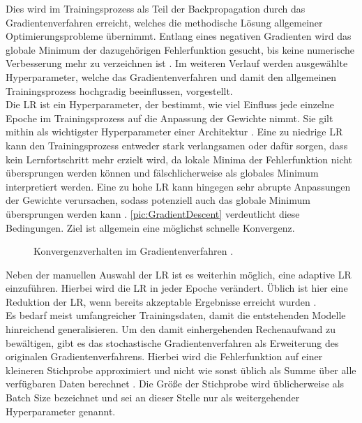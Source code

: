\noindent
Dies wird im Trainingsprozess als Teil der Backpropagation durch das Gradientenverfahren erreicht, welches die methodische Lösung allgemeiner Optimierungsprobleme übernimmt. Entlang eines negativen Gradienten wird das globale Minimum der dazugehörigen Fehlerfunktion gesucht, bis keine numerische Verbesserung mehr zu verzeichnen ist \cite[S.~428]{ZHA20}. Im weiteren Verlauf werden ausgewählte Hyperparameter, welche das Gradientenverfahren und damit den allgemeinen Trainingsprozess hochgradig beeinflussen, vorgestellt.\\

\noindent
Die \ac{LR} ist ein Hyperparameter, der bestimmt, wie viel Einfluss jede einzelne Epoche im Trainingsprozess auf die Anpassung der Gewichte nimmt. Sie gilt mithin als wichtigster Hyperparameter einer Architektur \cite[S.~208]{GOO16}. Eine zu niedrige \ac{LR} kann den Trainingsprozess entweder stark verlangsamen oder dafür sorgen, dass kein Lernfortschritt mehr erzielt wird, da lokale Minima der Fehlerfunktion nicht übersprungen werden können und fälschlicherweise als globales Minimum interpretiert werden. Eine zu hohe \ac{LR} kann hingegen sehr abrupte Anpassungen der Gewichte verursachen, sodass potenziell auch das globale Minimum übersprungen werden kann \cite[S.~414-415]{ZHA20}. \autoref{pic:GradientDescent} verdeutlicht diese Bedingungen. Ziel ist allgemein eine möglichst schnelle Konvergenz.\\

\begin{figure}[h!]
  \centering
  \caption{Konvergenzverhalten im Gradientenverfahren \cite[S.~429]{ZHA20}.}
  \label{pic:GradientDescent}
\end{figure}
\newpage

\noindent
Neben der manuellen Auswahl der \ac{LR} ist es weiterhin möglich, eine adaptive \ac{LR} einzuführen. Hierbei wird die \ac{LR} in jeder Epoche verändert. Üblich ist hier eine Reduktion der \ac{LR}, wenn bereits akzeptable Ergebnisse erreicht wurden \cite[S.~433]{ZHA20}.\\

\noindent
Es bedarf meist umfangreicher Trainingsdaten, damit die entstehenden Modelle hinreichend generalisieren. Um den damit einhergehenden Rechenaufwand zu bewältigen, gibt es das stochastische Gradientenverfahren als Erweiterung des originalen Gradientenverfahrens. Hierbei wird die Fehlerfunktion auf einer kleineren Stichprobe approximiert und nicht wie sonst üblich als Summe über alle verfügbaren Daten berechnet \cite[S.~149]{GOO16}. Die Größe der Stichprobe wird üblicherweise als Batch Size bezeichnet und sei an dieser Stelle nur als weitergehender Hyperparameter genannt.\\

